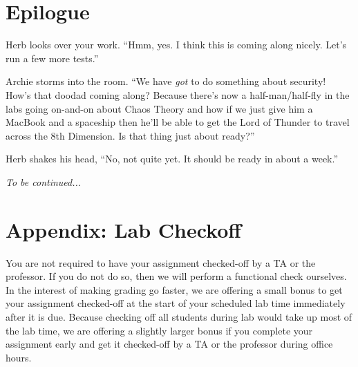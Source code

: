 \section*{Epilogue}

Herb looks over your work. ``Hmm, yes. I think this is coming along nicely.
Let's run a few more tests.''

Archie storms into the room. ``We have \textit{got} to do something about
security! How's that doodad coming along? Because there's now a
 half-man/half-fly in the labs going on-and-on about Chaos Theory and how if we
 just give him a MacBook and a spaceship then he'll be able to get the Lord of
 Thunder to travel across the 8th Dimension. Is that thing just about ready?''

Herb shakes his head, ``No, not quite yet. It should be ready in about a week.''

\textit{To be continued...}

\newpage\appendix

\section{Appendix: Lab Checkoff}

You are not required to have your assignment checked-off by a TA or the
professor. If you do not do so, then we will perform a functional check
ourselves. In the interest of making grading go faster, we are offering a small
bonus to get your assignment checked-off at the start of your scheduled lab
time immediately after it is due. Because checking off all students during lab
would take up most of the lab time, we are offering a slightly larger bonus if
you complete your assignment early and get it checked-off by a TA or the
professor during office hours.

